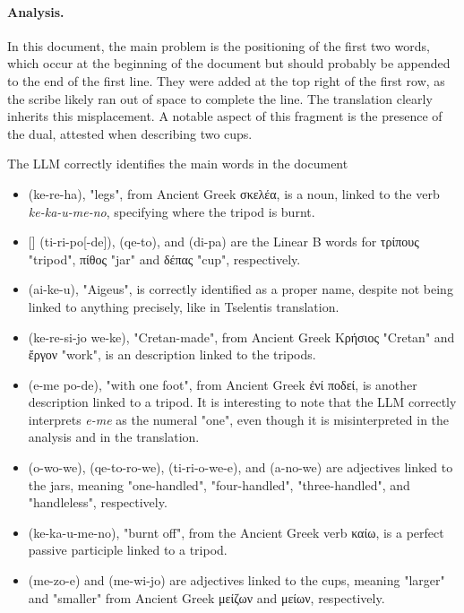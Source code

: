 \paragraph{Analysis.}
In this document, the main problem is the positioning of the first two words, which occur at the beginning of the document but should probably be appended to the end of the first line.
They were added at the top right of the first row, as the scribe likely ran out of space to complete the line.
The translation clearly inherits this misplacement.
A notable aspect of this fragment is the presence of the dual, attested when describing two cups.

The LLM correctly identifies the main words in the document
\begin{itemize}
  \item \textlinb{\Bke\Bre\Bre\Baii} (ke-re-ha), "legs", from Ancient Greek \textgreek{σκελέα}, is a noun, linked to the verb \textit{ke-ka-u-me-no}, specifying where the tripod is burnt.  
  \item \textlinb{\Bti\Bri\Bpo}[\textlinb{\Bde}] (ti-ri-po[-de]), \textlinb{\Bqe\Bto} (qe-to), and \textlinb{\Bdi\Bpa} (di-pa) are the Linear B words for \textgreek{τρίπους} "tripod", \textgreek{πίθος} "jar" and \textgreek{δέπας} "cup", respectively.
  \item \textlinb{\Ba\Bi\Bke\Bu} (ai-ke-u), "Aigeus", is correctly identified as a proper name, despite not being linked to anything precisely, like in Tselentis translation.
  \item \textlinb{\Bke\Bre\Bse\Bi\Bjo} \textlinb{\Bwe\Bke} (ke-re-si-jo we-ke), "Cretan-made", from Ancient Greek \textgreek{Κρήσιος} "Cretan" and \textgreek{ἔργον} "work", is an description linked to the tripods. 
  \item \textlinb{\Be\Bme} \textlinb{\Bpo\Bde} (e-me po-de), "with one foot", from Ancient Greek \textgreek{ἐνί ποδεί}, is another description linked to a tripod.
  It is interesting to note that the LLM correctly interprets \textit{e-me} as the numeral "one", even though it is misinterpreted in the analysis and in the translation.
  \item \textlinb{\Bo\Bwo\Bwe} (o-wo-we), \textlinb{\Bqe\Bto\Bro\Bwe} (qe-to-ro-we), \textlinb{\Bti\Bri\Bjo\Bwe} (ti-ri-o-we-e), and \textlinb{\Ba\Bo\Bno\Be} (a-no-we) are adjectives linked to the jars, meaning "one-handled", "four-handled", "three-handled", and "handleless", respectively.
  \item \textlinb{\Bke\Bka\Bu\Bme\Bno} (ke-ka-u-me-no), "burnt off", from the Ancient Greek verb \textgreek{καίω}, is a perfect passive participle linked to a tripod.
  \item \textlinb{\Bme\Bzo\Be} (me-zo-e) and \textlinb{\Bme\Bwi\Bjo} (me-wi-jo) are adjectives linked to the cups, meaning "larger" and "smaller" from Ancient Greek \textgreek{μείζων} and \textgreek{μείων}, respectively.
\end{itemize}

